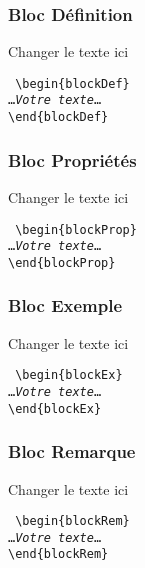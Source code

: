 \documentclass[aspectratio=169]{beamer}
\begin{document}
\begin{frame}
\frametitle{Bloc \og Définition\fg}
\begin{blockDef}
Changer le texte ici
\end{blockDef}
\noindent\texttt{%
\textbackslash begin\{blockDef\}\\
\ldots\emph{Votre texte}\ldots\\
\textbackslash end\{blockDef\}
}%
\end{frame}
\begin{frame}
    \frametitle{Bloc \og Propriétés\fg}
    \begin{blockProp}
        Changer le texte ici
    \end{blockProp}
\noindent\texttt{%
\textbackslash begin\{blockProp\}\\
\ldots\emph{Votre texte}\ldots\\
\textbackslash end\{blockProp\}
}%
\end{frame}
\begin{frame}
\frametitle{Bloc \og Exemple\fg}
\begin{blockEx}
Changer le texte ici
\end{blockEx}
\noindent\texttt{%
\textbackslash begin\{blockEx\}\\
\ldots\emph{Votre texte}\ldots\\
\textbackslash end\{blockEx\}
}%
\end{frame}
\begin{frame}
\frametitle{Bloc \og Remarque\fg}
\begin{blockRem}
Changer le texte ici
\end{blockRem}
\noindent\texttt{%
\textbackslash begin\{blockRem\}\\
\ldots\emph{Votre texte}\ldots\\
\textbackslash end\{blockRem\}}%
\end{frame}
\end{document}
